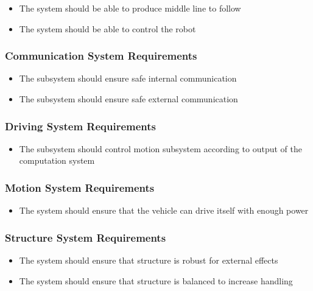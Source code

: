 \documentclass[a4paper,12pt]{article}
\begin{document}
			\begin{itemize}
				\item The system should	be able to produce middle line to follow
				\item The system should be able to control the robot
			\end{itemize}	
	
	
		\subsubsection{Communication System Requirements}
		
			\begin{itemize}
				\item The subsystem should ensure safe internal communication
				\item The subsystem should ensure safe external communication
			\end{itemize}
		
		
		\subsubsection{Driving System Requirements}
	
			\begin{itemize}
				\item The subsystem should control motion subsystem according to output of the computation system
			\end{itemize}
	


		\subsubsection{Motion System Requirements}
	
			\begin{itemize}
				\item The system should	ensure that the vehicle can drive itself with enough power
			\end{itemize}
	
	
	
		\subsubsection{Structure System Requirements}
	
			\begin{itemize}
				\item The system should	ensure that structure is robust for external effects 
				\item The system should	ensure that structure is balanced to increase handling
	
			\end{itemize}
	
\end{document}
